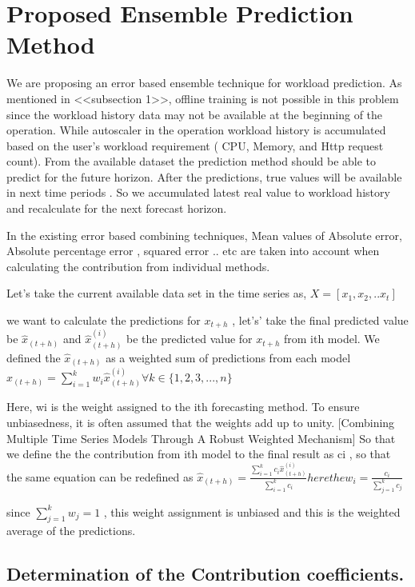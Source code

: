 \section{Proposed Ensemble Prediction Method}

We are proposing an error based ensemble technique for workload prediction. As mentioned in <<subsection 1>>, 
offline training is not possible in this problem since the  workload history data may not be available at the 
beginning of the operation. While autoscaler in the operation workload history  is accumulated based on the user's 
workload requirement ( CPU, Memory, and Http request count). From the available dataset the prediction method 
should be able to predict for the future horizon. After the predictions, true values will be available in next time 
periods . So we accumulated latest real value to workload history and recalculate for the next forecast horizon. 
        
    In the existing error based combining techniques, Mean values of Absolute error, Absolute percentage error , 
squared error .. etc are taken into account when calculating the contribution from individual methods. 

Let's take the current available data set in the time series as, $X=[x_{1},x_{2},.. x_{t}]$  

we want to calculate the predictions for  $x_{t+h}$ , let's’ take the final predicted value be $\hat{x}_{(t+h)}$ and $\hat{x}_{(t+h)}^{(i)}$ be the predicted value for $x_{t+h}$ from ith model. We defined the $\hat{x}_{(t+h)}$ as a weighted sum of predictions from each model
 $\hat{x}_{(t+h)}= \sum_{i=1}^{k}w_i \hat{x}_{(t+h)}^{(i)}$$   $$\forall k \in \{1,2,3,...,n\}$

Here, wi is the weight assigned to the ith forecasting method. To ensure unbiasedness, it is often assumed that the weights add up to unity. [Combining Multiple Time Series Models Through A Robust Weighted Mechanism]
So that we define the the contribution from ith model to the final result as ci , so that the same equation can be redefined as  
$\hat{x}_{(t+h)}= \frac{\sum_{i=1}^{k}c_i \hat{x}_{(t+h)}^{(i)}}{\sum_{i=1}^{k}c_i}  here the   w_{i}= \frac{c_{i}}{\sum_{j=1}^{k}c_j}$  

since   $\sum_{j=1}^{k}w_{j}=1$ , this weight assignment is unbiased and this is the weighted average of the predictions.


\subsection{Determination of the Contribution coefficients.}


